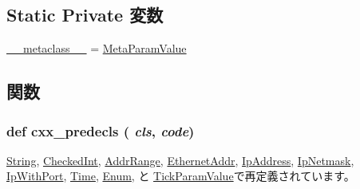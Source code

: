 \subsection*{Static Private 変数}
\begin{DoxyCompactItemize}
\item 
\hyperlink{classm5_1_1params_1_1ParamValue_adfc4d1824f4ecdcbb04ceafc5bbc933e}{\_\-\_\-metaclass\_\-\_\-} = \hyperlink{classm5_1_1params_1_1MetaParamValue}{MetaParamValue}
\end{DoxyCompactItemize}


\subsection{関数}
\hypertarget{classm5_1_1params_1_1ParamValue_a0b408a11a14bd1d770e28f71a6e14ab5}{
\subsubsection[{cxx\_\-predecls}]{\setlength{\rightskip}{0pt plus 5cm}def cxx\_\-predecls ( {\em cls}, \/   {\em code})}}
\label{classm5_1_1params_1_1ParamValue_a0b408a11a14bd1d770e28f71a6e14ab5}


\hyperlink{classm5_1_1params_1_1String_a0b408a11a14bd1d770e28f71a6e14ab5}{String}, \hyperlink{classm5_1_1params_1_1CheckedInt_a0b408a11a14bd1d770e28f71a6e14ab5}{CheckedInt}, \hyperlink{classm5_1_1params_1_1AddrRange_a0b408a11a14bd1d770e28f71a6e14ab5}{AddrRange}, \hyperlink{classm5_1_1params_1_1EthernetAddr_a0b408a11a14bd1d770e28f71a6e14ab5}{EthernetAddr}, \hyperlink{classm5_1_1params_1_1IpAddress_a0b408a11a14bd1d770e28f71a6e14ab5}{IpAddress}, \hyperlink{classm5_1_1params_1_1IpNetmask_a0b408a11a14bd1d770e28f71a6e14ab5}{IpNetmask}, \hyperlink{classm5_1_1params_1_1IpWithPort_a0b408a11a14bd1d770e28f71a6e14ab5}{IpWithPort}, \hyperlink{classm5_1_1params_1_1Time_a0b408a11a14bd1d770e28f71a6e14ab5}{Time}, \hyperlink{classm5_1_1params_1_1Enum_a0b408a11a14bd1d770e28f71a6e14ab5}{Enum}, と \hyperlink{classm5_1_1params_1_1TickParamValue_a0b408a11a14bd1d770e28f71a6e14ab5}{TickParamValue}で再定義されています。


